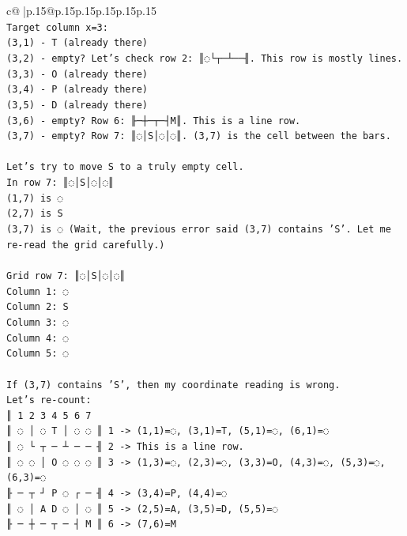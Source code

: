 \documentclass{article}
\begin{document}
{\begin{supertabular}{c@{$\;$}|p{.15\linewidth}@{}p{.15\linewidth}p{.15\linewidth}p{.15\linewidth}p{.15\linewidth}p{.15\linewidth}}
{{{\\ 
\texttt{Target column x=3:} \\
\texttt{(3,1) {-} T (already there)} \\
\texttt{(3,2) {-} empty? Let's check row 2: ║◌└┬─┴──╢. This row is mostly lines.} \\
\texttt{(3,3) {-} O (already there)} \\
\texttt{(3,4) {-} P (already there)} \\
\texttt{(3,5) {-} D (already there)} \\
\texttt{(3,6) {-} empty? Row 6: ╟─┼─┬─┤M║. This is a line row.} \\
\texttt{(3,7) {-} empty? Row 7: ║◌│S│◌│◌║. (3,7) is the cell between the bars.} \\
\\ 
\texttt{Let's try to move S to a truly empty cell.} \\
\texttt{In row 7: ║◌│S│◌│◌║} \\
\texttt{(1,7) is ◌} \\
\texttt{(2,7) is S} \\
\texttt{(3,7) is ◌ (Wait, the previous error said (3,7) contains 'S'. Let me re{-}read the grid carefully.)} \\
\\ 
\texttt{Grid row 7: ║◌│S│◌│◌║} \\
\texttt{Column 1: ◌} \\
\texttt{Column 2: S} \\
\texttt{Column 3: ◌} \\
\texttt{Column 4: ◌} \\
\texttt{Column 5: ◌} \\
\\ 
\texttt{If (3,7) contains 'S', then my coordinate reading is wrong.} \\
\texttt{Let's re{-}count:} \\
\texttt{║ 1 2 3 4 5 6 7} \\
\texttt{║ ◌ │ ◌ T │ ◌ ◌ ║ 1 {-}> (1,1)=◌, (3,1)=T, (5,1)=◌, (6,1)=◌} \\
\texttt{║ ◌ └ ┬ ─ ┴ ─ ─ ╢ 2 {-}> This is a line row.} \\
\texttt{║ ◌ ◌ │ O ◌ ◌ ◌ ║ 3 {-}> (1,3)=◌, (2,3)=◌, (3,3)=O, (4,3)=◌, (5,3)=◌, (6,3)=◌} \\
\texttt{╟ ─ ┬ ┘ P ◌ ┌ ─ ╢ 4 {-}> (3,4)=P, (4,4)=◌} \\
\texttt{║ ◌ │ A D ◌ │ ◌ ║ 5 {-}> (2,5)=A, (3,5)=D, (5,5)=◌} \\
\texttt{╟ ─ ┼ ─ ┬ ─ ┤ M ║ 6 {-}> (7,6)=M} \\
}}}
\end{supertabular}}
\end{document}
